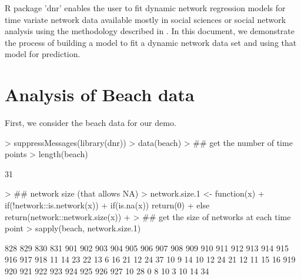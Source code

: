 \documentclass[12pt]{article}
\begin{document}

\newcommand\myeq{\mathrel{\stackrel{\makebox[0pt]{\mbox{\normalfont\tiny def}}}{=}}}

\begin{Schunk}
\end{Schunk}

\maketitle

R package 'dnr' enables the user to fit dynamic network regression models for time variate network data available mostly in social sciences or social network analysis using the methodology described in \cite{2018arXiv180708834M}. In this document, we demonstrate the process of building a model to fit a dynamic network data set and using that model for prediction.

\section{Analysis of Beach data}
\label{sec:analysis-beach-data}

First, we consider the beach data for our demo.



\begin{Schunk}
\begin{Sinput}
> suppressMessages(library(dnr))
> data(beach)
> ## get the number of time points
> length(beach)
\end{Sinput}
\begin{Soutput}
[1] 31
\end{Soutput}
\begin{Sinput}
> ## network size (that allows NA)
> network.size.1 <- function(x){
+   if(!network::is.network(x)){
+     if(is.na(x)) return(0)
+   } else return(network::network.size(x))
+ }
> ## get the size of networks at each time point
> sapply(beach, network.size.1)
\end{Sinput}
\begin{Soutput}
828 829 830 831 901 902 903 904 905 906 907 908 909 910 911 912 913 914 915 916 917 918 
 11  14  23  22  13   6  16  21  12  24  37  10   9  14  10  12  24  21  12  11  15  16 
919 920 921 922 923 924 925 926 927 
 10  28   0   8  10   3  10  14  34 
\end{Soutput}
\end{Schunk}
\end{document}
